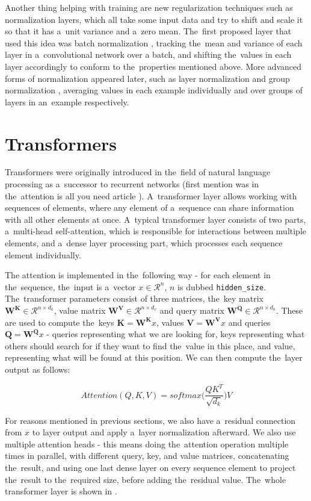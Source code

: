 Another thing helping with training are new regularization techniques such as normalization layers, which all take some input data and try to shift and scale it so that it has a~unit variance and a~zero mean. The~first proposed layer that used this idea was batch normalization \citep{batch_norm}, tracking the~mean and variance of each layer in a~convolutional network over a batch, and shifting the~values in each layer accordingly to conform to the~properties mentioned above. More advanced forms of normalization appeared later, such as layer normalization \citep{layer_norm} and group normalization \citep{group_norm}, averaging values in each example individually and over groups of layers in an~example respectively.


\section{Transformers}

Transformers were originally introduced in the~field of natural language processing as a~successor to recurrent networks (first mention was in the~attention is all you need article \citep{attention_is_all_you_need}). A~transformer layer allows working with sequences of elements, where any element of a~sequence can share information with all other elements at once. A~typical transformer layer consists of two parts, a~multi-head self-attention, which is responsible for interactions between multiple elements, and a~dense layer processing part, which processes each sequence element individually.

The attention is implemented in the~following way - for each element in the~sequence, the~input is a~vector $x \in \mathcal{R}^n$, $n$ is dubbed \texttt{hidden\_size}. The~transformer parameters consist of three matrices, the~key matrix $\mathbf{W^K} \in \mathcal{R}^{n \times d_k}$, value matrix $\mathbf{W^V} \in \mathcal{R}^{n \times d_v}$ and query matrix $\mathbf{W^Q} \in \mathcal{R}^{n \times d_k}$. These are used to compute the~keys $\mathbf{K}=\mathbf{W^K}x$, values $\mathbf{V}=\mathbf{W^V}x$ and queries $\mathbf{Q}=\mathbf{W^Q}x$ - queries representing what we are looking for, keys representing what others should search for if they want to find the~value in this place, and value, representing what will be found at this position. We can then compute the~layer output as follows:

$$Attention(Q, K, V) = softmax \biggl( \frac{QK^T}{\sqrt{d_k}} \biggl) V$$

For reasons mentioned in previous sections, we also have a~residual connection from $x$ to layer output and apply a~layer normalization afterward. We also use multiple attention heads - this means doing the~attention operation multiple times in parallel, with different query, key, and value matrices, concatenating the~result, and using one last dense layer on every sequence element to project the~result to the~required size, before adding the~residual value. The~whole transformer layer is shown in .

